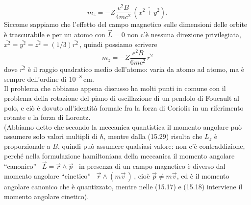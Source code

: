 \begin{equation}
  m_z=-Z\frac{e^2B}{4mc^2}\,(\overline{x^2+y^2}).
  \tag{15.30}
\end{equation}
Siccome sappiamo che l'effetto del campo magnetico sulle dimensioni delle orbite
\`e trascurabile e per un atomo con $\vec L=0$ non c'\`e nessuna direzione
privilegiata,
\ $\overline{x^2}=\overline{y^2}=\overline{z^2}=(1/3)\overline{r^2}$\,, quindi
possiamo scrivere
\begin{equation}
  m_z=-Z\frac{e^2B}{6mc^2}\,\overline{r^2}
  \tag{15.31}
\end{equation}
dove $\overline{r^2}$ \`e il raggio quadratico medio dell'atomo: varia da atomo
ad atomo, ma \`e sempre dell'ordine di $10^{-8}\,$cm.\\
Il problema che abbiamo appena discusso ha molti punti in comune con il problema
della rotazione del piano di oscillazione di un pendolo di Foucault al polo, e
ci\`o \`e dovuto all'identit\`a formale fra la forza di Coriolis in un
riferimento rotante e la forza di Lorentz.\\
(Abbiamo detto che secondo la meccanica quantistica il momento angolare pu\`o
assumere solo valori multipli di $\hbar$, mentre dalla (15.29) risulta che $L_z$
\`e proporzionale a $B$, quindi pu\`o assumere qualsiasi valore: non c'\`e
contraddizione, perch\'e nella formulazione hamiltoniana della meccanica il
momento angolare ``canonico'' \ $\vec L=\vec r\wedge\vec p$ \ in presenza di un
campo magnetico \`e diverso dal momento angolare ``cinetico''
\ $\vec r\wedge(m\vec v\,)$\,, cio\`e $\vec p\neq m\vec v$, ed \`e il momento
angolare canonico che \`e quantizzato, mentre nelle (15.17) e (15.18) interviene
il momento angolare cinetico\big).

